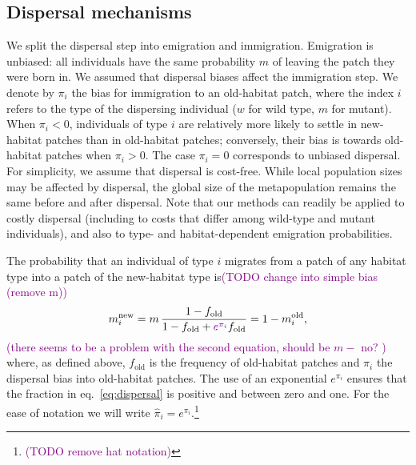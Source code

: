 \documentclass[11pt]{article}
\newcommand{\florence}[1]{\textcolor{purple}{(#1)}} %
\newcommand{\chg}[1]{\textcolor{change}{#1}}
\begin{document}
\subsection*{Dispersal mechanisms}

We split the dispersal step into emigration and immigration. Emigration is unbiased: all individuals have the same probability $m$ of leaving the patch they were born in. We assumed that dispersal biases affect the immigration step. 
We denote by $\pi_{i}$ the bias for immigration to an old-habitat patch, where the index $i$ refers to the type of the dispersing individual ($w$ for wild type, $m$ for mutant). When $\pi_i<0$, individuals of type $i$ are relatively more likely to settle in new-habitat patches than in old-habitat patches; conversely, their bias is towards old-habitat patches when $\pi_i>0$. The case $\pi_i=0$ corresponds to unbiased dispersal. 
For simplicity, we assume that dispersal is cost-free. While local population sizes may be affected by dispersal, the global size of the metapopulation remains the same before and after dispersal.  Note that our methods can readily be applied to costly dispersal (including to costs that differ among wild-type and mutant individuals), and also to type- and habitat-dependent emigration probabilities. 

The probability that an individual of type $i$ migrates from a patch of any habitat type into a patch of the new-habitat type is\florence{TODO change into simple bias (remove m)}
%
\begin{equation}\label{eq:dispersal}
\begin{aligned}
m_i^{\text{new}} &= m\, \frac{1-f_{\text{old}}}{1-f_{\text{old}}+\chg{e^{\pi_i}} f_{\text{old}}} = 1-m_i^{\text{old}},\\
\end{aligned}
\end{equation}
\florence{there seems to be a problem with the second equation, should be $m -$ no? }
where, as defined above, $f_{\text{old}}$ is the frequency of old-habitat patches and $\pi_i$ the dispersal bias into old-habitat patches. The use of an exponential $e^{\pi_i}$  ensures that the fraction in eq.~\eqref{eq:dispersal} is positive and between zero and one. For the ease of notation we will write $\widehat{\pi}_i=e^{\pi_i}$.\footnote{\florence{TODO remove hat notation}}
\end{document}
